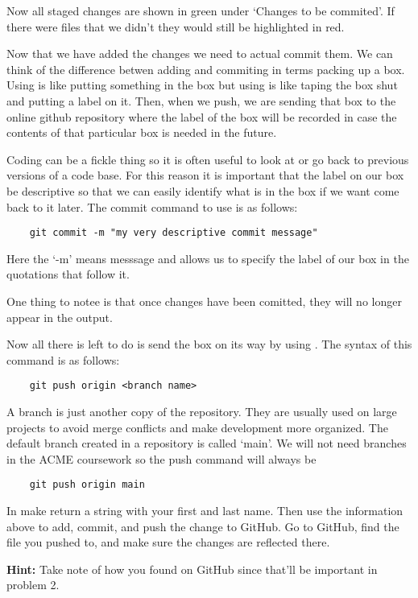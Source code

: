 Now all staged changes are shown in green under `Changes to be commited'. If there were files that we didn't  they would 
still be highlighted in red.

Now that we have added the changes we need to actual commit them. We can think of the difference betwen adding and commiting in terms packing up a box. 
Using  is like putting something in the box but using  is like taping the box shut and putting a label on it. Then, when we push, we are 
sending that box to the online github repository where the label of the box will  be recorded in case the contents of that particular box is needed in the future.

Coding can be a fickle thing so it is often useful to look at or go back to previous versions of a code base. For this reason 
it is important that the label on our box be descriptive so that we can easily identify what is in the box if we want come back
to it later. The commit command to use is as follows:

\begin{lstlisting}
    git commit -m "my very descriptive commit message"
\end{lstlisting}

Here the `-m' means messsage and allows us to specify the label of our box 
in the quotations that follow it. 

One thing to notee is that once changes have been comitted, they will no longer
appear in the  output. 

Now all there is left to do is send the box on its way by using . The syntax of this command is as follows:

\begin{lstlisting}
    git push origin <branch name>
\end{lstlisting}

A branch is just another copy of the repository. They are usually used on large projects to avoid merge conflicts and make development more organized. The default
branch created in a repository is called `main'. We will not need branches in the ACME coursework so the push command will always be

\begin{lstlisting}
    git push origin main
\end{lstlisting}

\begin{problem}
    In  make  return a string with your first and last name. Then use the information above to add, commit, and push the change to GitHub.
    Go to GitHub, find the file you pushed to, and make sure the changes are reflected there. 
    
    \textbf{Hint:} Take note of how you found  on GitHub since that'll be important in problem 2.
\end{problem}

